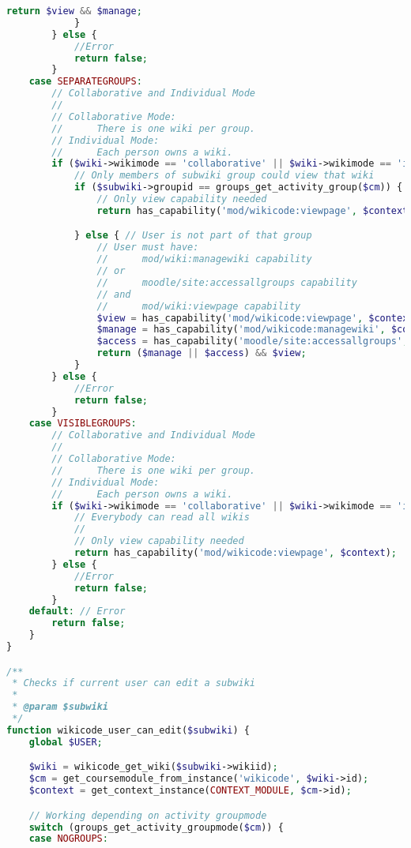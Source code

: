 \begin{lstlisting}[language=PHP]
                return $view && $manage;
            }
        } else {
            //Error
            return false;
        }
    case SEPARATEGROUPS:
        // Collaborative and Individual Mode
        //
        // Collaborative Mode:
        //      There is one wiki per group.
        // Individual Mode:
        //      Each person owns a wiki.
        if ($wiki->wikimode == 'collaborative' || $wiki->wikimode == 'individual') {
            // Only members of subwiki group could view that wiki
            if ($subwiki->groupid == groups_get_activity_group($cm)) {
                // Only view capability needed
                return has_capability('mod/wikicode:viewpage', $context);

            } else { // User is not part of that group
                // User must have:
                //      mod/wiki:managewiki capability
                // or
                //      moodle/site:accessallgroups capability
                // and
                //      mod/wiki:viewpage capability
                $view = has_capability('mod/wikicode:viewpage', $context);
                $manage = has_capability('mod/wikicode:managewiki', $context);
                $access = has_capability('moodle/site:accessallgroups', $context);
                return ($manage || $access) && $view;
            }
        } else {
            //Error
            return false;
        }
    case VISIBLEGROUPS:
        // Collaborative and Individual Mode
        //
        // Collaborative Mode:
        //      There is one wiki per group.
        // Individual Mode:
        //      Each person owns a wiki.
        if ($wiki->wikimode == 'collaborative' || $wiki->wikimode == 'individual') {
            // Everybody can read all wikis
            //
            // Only view capability needed
            return has_capability('mod/wikicode:viewpage', $context);
        } else {
            //Error
            return false;
        }
    default: // Error
        return false;
    }
}

/**
 * Checks if current user can edit a subwiki
 *
 * @param $subwiki
 */
function wikicode_user_can_edit($subwiki) {
    global $USER;

    $wiki = wikicode_get_wiki($subwiki->wikiid);
    $cm = get_coursemodule_from_instance('wikicode', $wiki->id);
    $context = get_context_instance(CONTEXT_MODULE, $cm->id);

    // Working depending on activity groupmode
    switch (groups_get_activity_groupmode($cm)) {
    case NOGROUPS:


\end{lstlisting}
